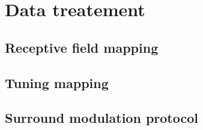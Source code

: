 \section{Data treatement}
\label{sec:sectionc}

\subsection{Receptive field mapping}
\label{subsec:subasectionC}

\subsection{Tuning mapping}
\label{subsec:subbsectionC}

\subsection{Surround modulation protocol}
\label{subsec:subcsectionC}